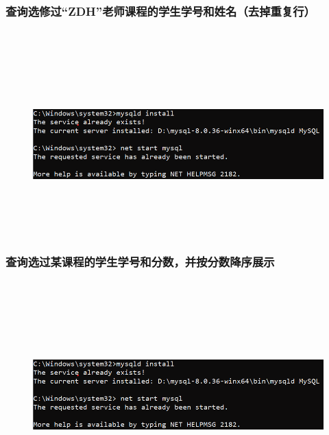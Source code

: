 \documentclass{ctexart}
\begin{document}
\subsubsection{查询选修过“ZDH”老师课程的学生学号和姓名（去掉重复行）}
\begin{lstlisting}[language=sql]
	
\end{lstlisting}
\begin{figure}[H]
	\centering 
	\includegraphics[height=7cm,width=14cm]{1.png}
	\end{figure}
\subsubsection{查询选过某课程的学生学号和分数，并按分数降序展示}
\begin{lstlisting}[language=sql]
	
\end{lstlisting}
\begin{figure}[H]
	\centering 
	\includegraphics[height=7cm,width=14cm]{1.png}
	\end{figure}
\end{document}
